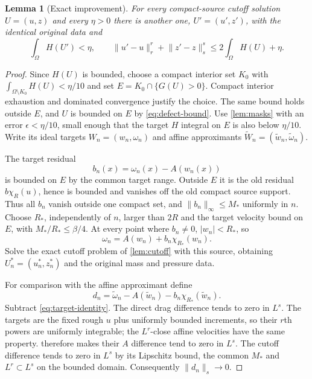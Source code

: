 \documentclass[11pt]{article}
\newtheorem{lemma}[lemma]{Lemma}
\theoremstyle{remark}
\newcommand{\norm}[2]{\lVert #1\rVert_{#2}}
\begin{document}
\begin{lemma}[Exact improvement]\label{lem:improvement}
For every compact-source cutoff solution $U=(u,z)$ and every $\eta>0$
there is another one, $U'=(u',z')$, with the identical original data and
\begin{equation}\label{eq:improvement}
 \int_\Omega H(U')<\eta,\qquad
 \norm{u'-u}{r}^r+\norm{z'-z}{s}^s\le2\int_\Omega H(U)+\eta.
\end{equation}
\end{lemma}
\begin{proof}
Since $H(U)$ is bounded, choose a compact interior set $K_0$ with
$\int_{\Omega\setminus K_0}H(U)<\eta/10$ and set
$E=K_0\cap\{G(U)>0\}$. Compact interior exhaustion and dominated
convergence justify the choice. The same bound holds outside $E$,
and $U$ is bounded on $E$ by \eqref{eq:defect-bound}.
Use \cref{lem:masks} with an error $\epsilon<\eta/10$, small enough
that the target $H$ integral on $E$ is also below $\eta/10$.
Write its ideal targets $W_n=(w_n,\omega_n)$ and affine approximants
$\widetilde W_n=(\widetilde w_n,\widetilde\omega_n)$.

The target residual
\[
 b_n(x)=\omega_n(x)-A(w_n(x))
\]
is bounded on $E$ by the common target range. Outside $E$ it is
the old residual $b\chi_R(u)$, hence is bounded and vanishes off the
old compact source support. Thus all $b_n$ vanish outside one compact
set, and $\norm{b_n}{\infty}\le M_*$ uniformly in $n$.
Choose $R_*$, independently of $n$, larger than $2R$ and the
target velocity bound on $E$, with $M_*/R_*\le\beta/4$.
At every point where $b_n\ne0$, $|w_n|<R_*$, so
\begin{equation}\label{eq:target-identity}
 \omega_n=A(w_n)+b_n\chi_{R_*}(w_n).
\end{equation}
Solve the exact cutoff problem of \cref{lem:cutoff} with this source,
obtaining $U_n^*=(u_n^*,z_n^*)$ and the original mass and pressure data.

For comparison with the affine approximant define
\[
 d_n=\widetilde\omega_n-A(\widetilde w_n)
          -b_n\chi_{R_*}(\widetilde w_n).
\]
Subtract \eqref{eq:target-identity}. The direct drag difference
tends to zero in $L^s$. The targets are the fixed rough $u$ plus
uniformly bounded increments, so their $r$th powers are uniformly
integrable; the $L^r$-close affine velocities have the same property.
 therefore makes their $A$ difference tend to
zero in $L^s$. The cutoff difference tends to zero in $L^s$ by
its Lipschitz bound, the common $M_*$ and $L^r\subset L^s$ on
the bounded domain. Consequently $\norm{d_n}{s}\to0$.


\end{proof}
\end{document}
